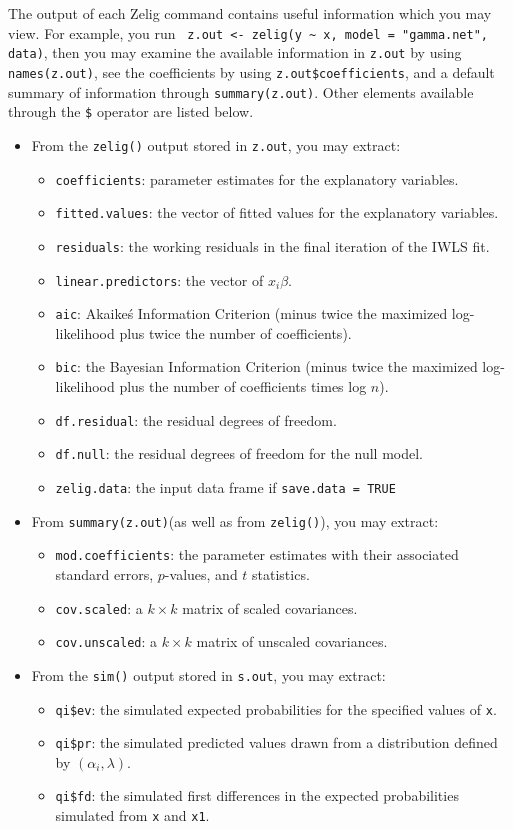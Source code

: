 The output of each Zelig command contains useful information which you may view. For example, you run \verb{ z.out <- zelig(y ~ x, model = "gamma.net", data){, then you may examine the available information in {\tt z.out} by using {\tt names(z.out)}, see the coefficients by using {\tt z.out\$coefficients}, and a default summary of information through {\tt summary(z.out)}. Other elements available through the {\tt \$} operator are listed below.  
\begin{itemize} 
\item From the {\tt zelig()} output stored in {\tt  z.out}, you may extract: 
\begin{itemize} 
\item {\tt coefficients}: parameter estimates for the explanatory variables. 
\item {\tt fitted.values}: the vector of fitted values for the explanatory variables. 
\item {\tt residuals}: the working residuals in the final iteration of the IWLS fit.  
\item {\tt linear.predictors}: the vector of $x_{i}\beta$. 
\item {\tt aic}: Akaike\'s Information Criterion (minus twice the maximized log-likelihood plus twice the number of coefficients). 
\item {\tt bic}: the Bayesian Information Criterion (minus twice the maximized log-likelihood plus the number of coefficients times log $n$). 
\item {\tt df.residual}: the residual degrees of freedom. 
\item {\tt df.null}: the residual degrees of freedom for the null model.  
\item {\tt zelig.data}: the input data frame if {\tt save.data = TRUE}  
 
\end{itemize} 
\item From {\tt summary(z.out)}(as well as from {\tt zelig()}), you may extract: 
\begin{itemize} 
\item {\tt mod.coefficients}: the parameter estimates with their associated standard errors, $p$-values, and $t$ statistics.  
\item {\tt cov.scaled}: a $k \times k$ matrix of scaled covariances. 
\item {\tt cov.unscaled}: a $k \times k$ matrix of unscaled covariances.  
\end{itemize} 
\item From the {\tt sim()} output stored in {\tt s.out}, you may extract: 
\begin{itemize} 
\item {\tt qi\$ev}: the simulated expected probabilities for the specified values of {\tt x}. 
\item {\tt qi\$pr}: the simulated predicted values drawn from a distribution defined by $(\alpha_i, \lambda)$. 
\item {\tt qi\$fd}: the simulated first differences in the expected probabilities simulated from {\tt x} and {\tt x1}. 
\end{itemize} 
\end{itemize} 
 
